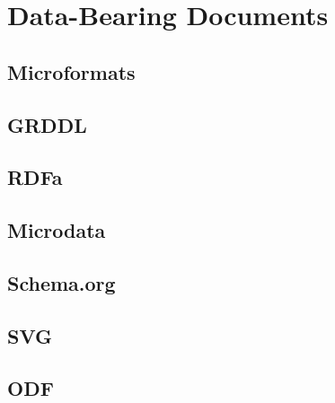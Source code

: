 \chapter{Data-Bearing Documents}

\section{Microformats}

\section{GRDDL}

\section{RDFa}

\section{Microdata}

\section{Schema.org}

\section{SVG}

\section{ODF}
